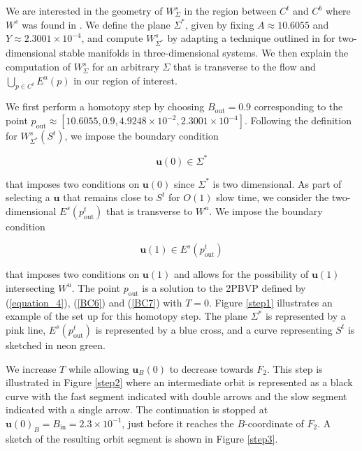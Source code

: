 \documentclass{ws-ijbc}
\begin{document}
We are interested in the geometry of $W^{s}_{\Sigma}$ in the region between $C^t$ and $C^b$ where $W^s$ was found in \cite{QSSA}.  We define the plane $\Sigma^*$, given by fixing $A\approx10.6055$ and $Y\approx2.3001 \times 10^{-4}$, and compute $W^{s}_{\Sigma^*}$ by adapting a technique outlined in \cite{Saeed_Paper} for two-dimensional stable manifolds in three-dimensional systems.  We then explain the computation of $W^{s}_{\Sigma}$ for an arbitrary $\Sigma$ that is transverse to the flow and $\bigcup_{p \in C^t} E^u(p)$ in our region of interest.
    
We first perform a homotopy step by choosing $B_{\mathrm{out}} = 0.9$ corresponding to the point $p_{\text{out}}\approx[10.6055, 0.9, 4.9248 \times 10^{-2}, 2.3001 \times 10^{-4}]$.  Following the definition for $W^s_{\Sigma^*}(S^t)$, we impose the boundary condition
    
\begin{equation}
\mathbf{u}(0) \in \Sigma^*
\label{BC6}
\end{equation}
    
 \noindent
that imposes two conditions on $\mathbf{u}(0)$ since $\Sigma^*$ is two dimensional.  As part of selecting a $\mathbf{u}$ that remains close to $S^t$ for $O(1)$ slow time, we consider the two-dimensional $E^s(p^t_{\text{out}})$ that is transverse to $W^u$.  We impose the boundary condition
    
\begin{equation}
\mathbf{u}(1) \in E^s(p^t_{\text{out}})
\label{BC7}
\end{equation}
    
\noindent
that imposes two conditions on $\mathbf{u}(1)$ and allows for the possibility of $\mathbf{u}(1)$ intersecting $W^u$.  The point $p_{\text{out}}$ is a solution to the 2PBVP defined by (\ref{equation_4}), (\ref{BC6}) and (\ref{BC7}) with $T=0$.  Figure \ref{step1} illustrates an example of the set up for this homotopy step.  The plane $\Sigma^*$ is represented by a pink line, $E^s(p^t_{\mathrm{out}})$ is represented by a blue cross, and a curve representing $S^t$ is sketched in neon green.
    
We increase $T$ while allowing $\mathbf{u}_{B}(0)$ to decrease towards $F_2$.  This step is illustrated in Figure \ref{step2} where an intermediate orbit is represented as a black curve with the fast segment indicated with double arrows and the slow segment indicated with a single arrow.  The continuation is stopped at $\mathbf{u}(0)_B = B_{\text{in}}=2.3 \times 10^{-1}$, just before it reaches the $B$-coordinate of $F_2$.  A sketch of the resulting orbit segment is shown in Figure \ref{step3}.
    
\end{document}
